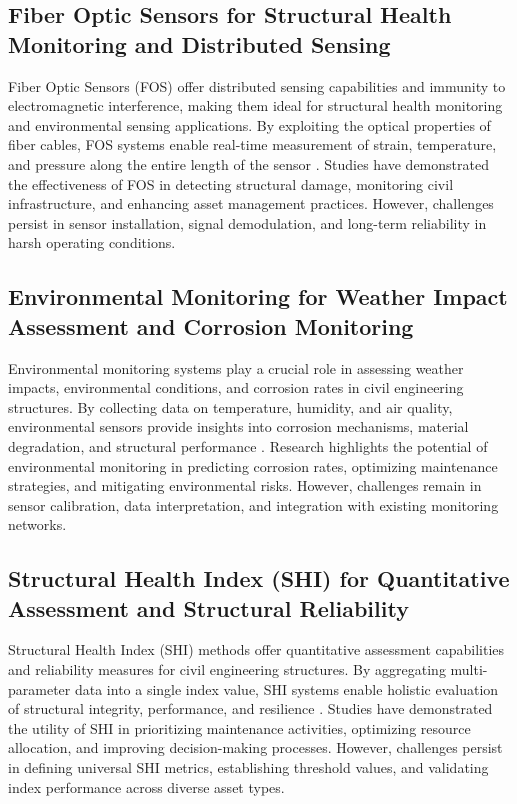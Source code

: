 \documentclass[journal, a4paper]{IEEEtran}
\begin{document}
\subsection{Fiber Optic Sensors for Structural Health Monitoring and Distributed Sensing}
Fiber Optic Sensors (FOS) offer distributed sensing capabilities and immunity to electromagnetic interference,
making them ideal for structural health monitoring and environmental sensing applications. By exploiting the
optical properties of fiber cables, FOS systems enable real-time measurement of strain, temperature, and pressure
along the entire length of the sensor \cite{zhang_spatial_2023} \cite{willmann_health_2023} \cite{zhang_structural_2021}. Studies have demonstrated the effectiveness of FOS in
detecting structural damage, monitoring civil infrastructure, and enhancing asset management practices. However,
challenges persist in sensor installation, signal demodulation, and long-term reliability in harsh operating conditions. 

\subsection{Environmental Monitoring for Weather Impact Assessment and Corrosion Monitoring}
Environmental monitoring systems play a crucial role in assessing weather impacts, environmental conditions,
and corrosion rates in civil engineering structures. By collecting data on temperature, humidity, and air quality,
environmental sensors provide insights into corrosion mechanisms, material degradation, and structural performance
\cite{parida_comparative_2023} \cite{dong_ultrasonic_2022} \cite{wang_fatigue_2023}. Research highlights the potential of environmental monitoring in predicting corrosion rates,
optimizing maintenance strategies, and mitigating environmental risks. However, challenges remain in sensor calibration,
data interpretation, and integration with existing monitoring networks. 

\subsection{Structural Health Index (SHI) for Quantitative Assessment and Structural Reliability}
Structural Health Index (SHI) methods offer quantitative assessment capabilities and reliability measures for civil
engineering structures. By aggregating multi-parameter data into a single index value, SHI systems enable holistic evaluation
of structural integrity, performance, and resilience \cite{rufai_cure_2020} \cite{pachon_evaluation_2020} \cite{zima_damage_2021}. Studies have demonstrated the utility of SHI
in prioritizing maintenance activities, optimizing resource allocation, and improving decision-making processes.
However, challenges persist in defining universal SHI metrics, establishing threshold values,
and validating index performance across diverse asset types. 
\end{document}
